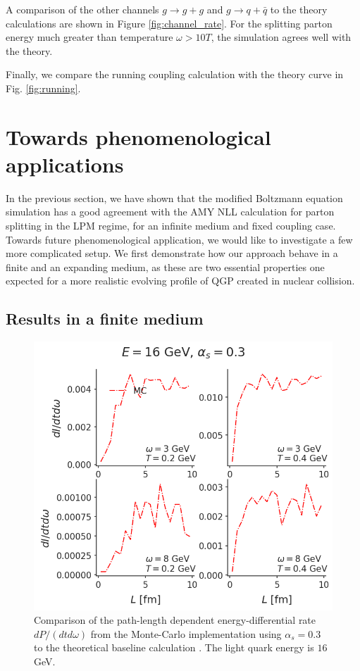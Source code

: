\documentclass[aps, prc, reprint, amsmath, groupedaddress, nofootinbib]{revtex4-1}
\begin{document}
A comparison of the other channels $g\rightarrow g+g$ and $g\rightarrow q+\bar{q}$ to the theory calculations are shown in Figure \ref{fig:channel_rate}.
For the splitting parton energy much greater than temperature $\omega > 10 T$, the simulation agrees well with the theory. 

Finally, we compare the running coupling calculation with the theory curve in Fig. \ref{fig:running}.


\section{Towards phenomenological applications}
In the previous section, we have shown that the modified Boltzmann equation simulation has a good agreement with the AMY NLL calculation for parton splitting in the LPM regime, for an infinite medium and fixed coupling case.
Towards future phenomenological application, we would like to investigate a few more complicated setup.
We first demonstrate how our approach behave in a finite and an expanding medium, as these are two essential properties one expected for a more realistic evolving profile of QGP created in nuclear collision.

\subsection{Results in a finite medium}
\begin{figure}
\includegraphics[width=\columnwidth]{spectrum_L.png}
\caption{Comparison of the path-length dependent energy-differential rate $dP/(dtd\omega)$ from the Monte-Carlo implementation using $\alpha_s = 0.3$ to the theoretical baseline calculation \cite{CaronHuot:2010bp}. The light quark energy is $16$ GeV.}
\label{fig:spectra-L-alphas=0.3}
\end{figure}
\end{document}
